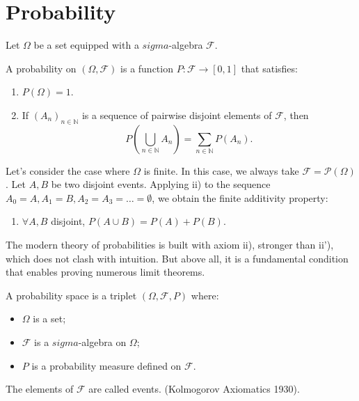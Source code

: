 \section{Probability}%
Let $\Omega$ be a set equipped with a $sigma$-algebra $\mathcal{F}$.%
\begin{definition}[Probability]
A probability on $(\Omega, \mathcal{F})$ is a function $P: \mathcal{F} \to [0,1]$ that satisfies:
\begin{enumerate}
    \item[i)] $P(\Omega) = 1$.
\item[ii)] If $(A_n)_{n \in \mathbb{N}}$ is a sequence of pairwise disjoint elements of $\mathcal{F}$, then
\[
        P\left(\bigcup_{n \in \mathbb{N}} A_n\right) = \sum_{n \in \mathbb{N}} P(A_n).
    \]
\end{enumerate}
\end{definition}%
Let's consider the case where $\Omega$ is finite. In this case, we always take $\mathcal{F} = \mathcal{P}(\Omega)$. Let $A, B$ be two disjoint events. Applying ii) to the sequence $A_0 = A, A_1=B, A_2=A_3=\dots=\emptyset$, we obtain the finite additivity property:%
\begin{enumerate}
    \item[ii')] $\forall A, B$ disjoint, $P(A \cup B) = P(A) + P(B)$.
\end{enumerate}%
The modern theory of probabilities is built with axiom ii), stronger than ii'), which does not clash with intuition. But above all, it is a fundamental condition that enables proving numerous limit theorems.%
\begin{definition}
A probability space is a triplet $(\Omega, \mathcal{F}, P)$ where:
\begin{itemize}
    \item $\Omega$ is a set;
    \item $\mathcal{F}$ is a $sigma$-algebra on $\Omega$;
    \item $P$ is a probability measure defined on $\mathcal{F}$.
\end{itemize}
The elements of $\mathcal{F}$ are called events. (Kolmogorov Axiomatics 1930).
\end{definition}%
